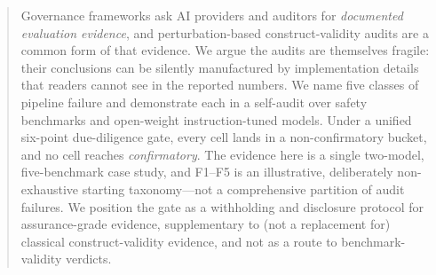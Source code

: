 \begin{abstract}
Governance frameworks ask AI providers and auditors for
\emph{documented evaluation evidence}, and perturbation-based
construct-validity audits are a common form of that evidence. We
argue the audits are themselves fragile: their conclusions can be
silently manufactured by implementation details that readers
cannot see in the reported numbers. We name five classes of
pipeline failure and demonstrate each in a self-audit over safety
benchmarks and open-weight instruction-tuned models. Under a
unified six-point due-diligence gate, every cell lands in a
non-confirmatory bucket, and no cell reaches \emph{confirmatory}.
The evidence here is a single two-model, five-benchmark case
study, and F1--F5 is an illustrative, deliberately non-exhaustive
starting taxonomy---not a comprehensive partition of audit
failures. We position the gate as a withholding and disclosure
protocol for assurance-grade evidence, supplementary to (not a
replacement for) classical construct-validity evidence, and not as
a route to benchmark-validity verdicts.
\end{abstract}
